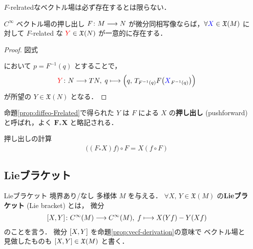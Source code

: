 \documentclass[geometry_main]{subfiles}
\begin{document}
$F$-relratedなベクトル場は必ず存在するとは限らない．

\begin{myprop}[label=prop:diffeo-Frelated]{$C^\infty$ ベクトル場の押し出し}
    $F \colon M \longrightarrow N$ が微分同相写像ならば，$\forall \textcolor{blue}{X} \in \mathfrak{X}(M)$ に対して $F$-related な $\textcolor{red}{Y} \in \mathfrak{X}(N)$ が一意的に存在する．
\end{myprop}

\begin{proof}
    図式
    \begin{center}
    \end{center}
    において $p = F^{-1}(q)$ とすることで，
    \begin{align}
        \textcolor{red}{Y} \colon N \longrightarrow TN,\; q \longmapsto \Bigl( q,\, T_{F^{-1}(q)} F \bigl(\textcolor{blue}{X}_{F^{-1}(q)}\bigr)  \Bigr) 
    \end{align}
    が所望の $Y \in \mathfrak{X}(N)$ となる．
\end{proof}

\begin{marker}
    命題\ref{prop:diffeo-Frelated}で得られた $Y$ は $F$ による $X$ の\textbf{押し出し} (pushforward) と呼ばれ，よく $\bm{F_* X}$ と略記される．
\end{marker}


\begin{mycol}[label=col:pushforward]{押し出しの計算}
    \begin{align}
        \bigl( (F_* X) f \bigr) \circ F = X(f \circ F)
    \end{align}
\end{mycol}

\subsection{Lieブラケット}

\begin{mydef}[label=def:Lie-bracket]{Lieブラケット}
    境界あり/なし \cinfty 多様体 $M$ を与える．
    $\forall X,\, Y \in \mathfrak{X}(M)$ の\textbf{Lieブラケット} (Lie bracket) とは，
    微分
    \begin{align}
        \label{eq:Liebracket}
        \comm{X}{Y} \colon C^\infty (M) \lto C^\infty (M),\; f \lmto X(Y f) - Y(X f)
    \end{align}
    のことを言う．
    \tcblower
    微分 $\comm{X}{Y}$ を命題\ref{prop:vecf-derivation}の意味で \cinfty ベクトル場と見做したものも $\comm{X}{Y} \in \mathfrak{X}(M)$ と書く．
\end{mydef}
\end{document}
